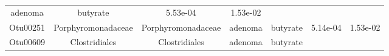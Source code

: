 \documentclass[11pt,]{article}
\begin{document}
\begin{longtable}[]{@{}ccccccc@{}}
\begin{minipage}[t]{0.09\columnwidth}
adenoma\strut
\end{minipage} & \begin{minipage}[t]{0.11\columnwidth}\centering\strut
butyrate\strut
\end{minipage} & \begin{minipage}[t]{0.09\columnwidth}\centering\strut
5.53e-04\strut
\end{minipage} & \begin{minipage}[t]{0.09\columnwidth}\centering\strut
1.53e-02\strut
\end{minipage}\tabularnewline
\begin{minipage}[t]{0.09\columnwidth}\centering\strut
Otu00251\strut
\end{minipage} & \begin{minipage}[t]{0.17\columnwidth}\centering\strut
Porphyromonadaceae\strut
\end{minipage} & \begin{minipage}[t]{0.17\columnwidth}\centering\strut
Porphyromonadaceae\strut
\end{minipage} & \begin{minipage}[t]{0.09\columnwidth}\centering\strut
adenoma\strut
\end{minipage} & \begin{minipage}[t]{0.11\columnwidth}\centering\strut
butyrate\strut
\end{minipage} & \begin{minipage}[t]{0.09\columnwidth}\centering\strut
5.14e-04\strut
\end{minipage} & \begin{minipage}[t]{0.09\columnwidth}\centering\strut
1.53e-02\strut
\end{minipage}\tabularnewline
\begin{minipage}[t]{0.09\columnwidth}\centering\strut
Otu00609\strut
\end{minipage} & \begin{minipage}[t]{0.17\columnwidth}\centering\strut
Clostridiales\strut
\end{minipage} & \begin{minipage}[t]{0.17\columnwidth}\centering\strut
Clostridiales\strut
\end{minipage} & \begin{minipage}[t]{0.09\columnwidth}\centering\strut
adenoma\strut
\end{minipage} & \begin{minipage}[t]{0.11\columnwidth}\centering\strut
butyrate\strut
\end{minipage} & \begin{minipage}[t]{0.09\columnwidth}\centering\strut

\end{minipage}
\end{longtable}
\end{document}
